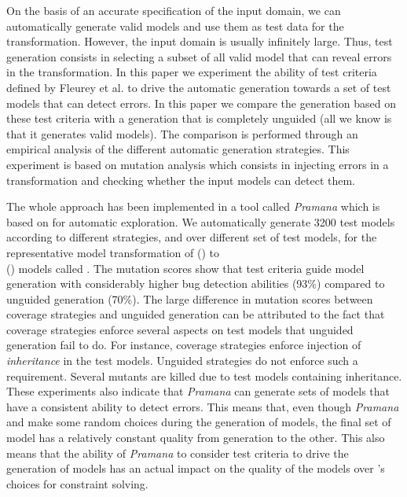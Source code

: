 On the basis of an accurate specification of the input domain, we can automatically generate valid models \cite{sen2008} and use them as test data for the transformation. However, the input domain is usually infinitely large. Thus, test generation consists in selecting a subset of all valid model that can reveal errors in the transformation. In this paper we experiment the ability of test criteria defined by Fleurey et al. \cite{franck2007} to drive the automatic generation towards a set of test models that can detect errors. In this paper we compare the generation based on these test criteria with a generation that is completely unguided (all we know is that it generates valid models). The comparison is performed through an empirical analysis of the different automatic generation strategies. This experiment is based on mutation analysis \cite{demillo1978}\cite{mottu2006} which consists in injecting errors in a transformation and checking whether the input models can detect them.

The whole approach has been implemented in a tool called \emph{Pramana} which is based on {\Alloy} \cite{daniel2006,sen2008} for automatic exploration. We automatically generate 3200 test models according to different strategies, and over different set of test models, for  the  representative model transformation of {\textUMLCD} ({\UMLCD}) to {\textRDBMS} \\ ({\RDBMS}) models called {\transfo}.  The mutation scores show that test criteria guide model generation with considerably higher bug detection abilities (93\%) compared to unguided generation (70\%).  The large difference in mutation scores between coverage strategies and unguided generation can be attributed to  the fact that coverage strategies enforce several aspects on test models that unguided generation fail to do. For instance, coverage strategies enforce injection of \emph{inheritance} in the {\UMLCD} test models. Unguided strategies do not enforce such a requirement. Several mutants are killed due to test models containing inheritance. These experiments also indicate that \emph{Pramana} can generate sets of models that have a consistent ability to detect errors. This means that, even though \emph{Pramana} and {\Alloy} make some random choices during the generation of models, the final set of model has a relatively constant quality from generation to the other. This also means that the ability of  \emph{Pramana} to consider test criteria to drive the generation of models has an actual impact on the quality of the models over {\Alloy}'s choices for constraint solving.	 

